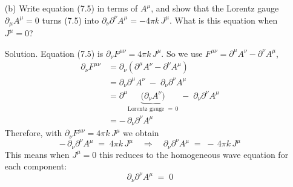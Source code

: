 \documentclass[12pt]{article}
\begin{document}
\begin{enumerate}
  
    \item[(b)] Write equation (7.5) in terms of $A^{\mu}$, and show that the Lorentz gauge $\partial_{\mu} A^{\mu}=0$ turns (7.5) into $\partial_{\nu}\partial^{\nu} A^{\mu}=-4\pi k\,J^{\mu}$. What is this equation when $J^{\mu}=0$?
  \item[Solution.]
  Equation (7.5) is $\partial_{\nu}F^{\mu\nu}=4\pi k\,J^{\mu}$. So we use $F^{\mu\nu}=\partial^{\mu}A^{\nu}-\partial^{\nu}A^{\mu}$,
  $$
  \begin{aligned}
  \partial_{\nu}F^{\mu\nu}
  &= \partial_{\nu}\!\left(\partial^{\mu}A^{\nu}-\partial^{\nu}A^{\mu}\right) \\
  &= \partial_{\nu}\partial^{\mu}A^{\nu}\;-\;\partial_{\nu}\partial^{\nu}A^{\mu} \\
  &= \partial^{\mu}\underbrace{\big(\partial_{\nu}A^{\nu}\big)}_{\text{Lorentz gauge }=\,0}
     \;-\;\partial_{\nu}\partial^{\nu}A^{\mu} \\
  &= -\,\partial_{\nu}\partial^{\nu}A^{\mu}
  \end{aligned}
  $$
  Therefore, with $\partial_{\nu}F^{\mu\nu}=4\pi k\,J^{\mu}$ we obtain
  $$
  -\,\partial_{\nu}\partial^{\nu}A^{\mu} \;=\; 4\pi k\,J^{\mu}
  \quad\Longrightarrow\quad
  \partial_{\nu}\partial^{\nu}A^{\mu} \;=\; -\,4\pi k\,J^{\mu}
  $$
  This means when $J^{\mu}=0$ this reduces to the homogeneous wave equation for each component:
  $$
  \partial_{\nu}\partial^{\nu}A^{\mu} \;=\; 0
  $$




\end{enumerate}
\null
\null
\newpage






\end{document}
